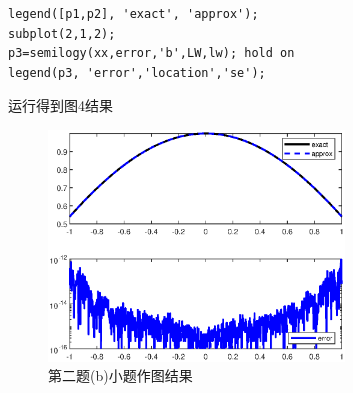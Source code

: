 \documentclass[12pt,a4paper,utf8]{ctexart}
\begin{document}
\begin{enumerate}
\begin{lstlisting}[frame=single]
legend([p1,p2], 'exact', 'approx');
subplot(2,1,2);
p3=semilogy(xx,error,'b',LW,lw); hold on
legend(p3, 'error','location','se');
\end{lstlisting}
运行得到图4结果
\begin{figure}[htbp]
    \centering
    \includegraphics[width=0.7\textwidth]{image/T2_b.eps}
    \caption{第二题(b)小题作图结果}
\end{figure}


\end{enumerate}
\end{document}
